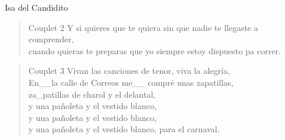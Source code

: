 \begin{song}[vals]{Isa del Candidito}
\begin{verse}{Couplet 2}
\chord{-}Y si quieres que te quiera sin que nadie te llegaste a comprender,\\
cuando quieras te preparas que yo siempre estoy dispuesto pa correr.\\
\end{verse}

\clearpage
\begin{verse}{Couplet 3}
Vivan las canciones de tenor, viva la alegría,\\
En\_\_la calle de Correos me\_\_ compré unas zapatillas,\\
za\_patillas de charol y el delantal,\\
y una pañoleta y el vestido blanco,\\
y una pañoleta y el vestido blanco,\\
y una pañoleta y el vestido blanco, para el carnaval.\\
\end{verse}

\end{song}

